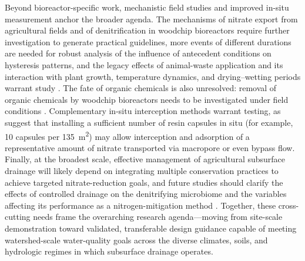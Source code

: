 \documentclass[11pt]{article}
\begin{document}
Beyond bioreactor-specific work, mechanistic field studies and improved in-situ measurement anchor the broader agenda. The mechanisms of nitrate export from agricultural fields and of denitrification in woodchip bioreactors require further investigation to generate practical guidelines, more events of different durations are needed for robust analysis of the influence of antecedent conditions on hysteresis patterns, and the legacy effects of animal-waste application and its interaction with plant growth, temperature dynamics, and drying--wetting periods warrant study \parencite{Liu2020}. The fate of organic chemicals is also unresolved: removal of organic chemicals by woodchip bioreactors needs to be investigated under field conditions \parencite{Ilhan2011}. Complementary in-situ interception methods warrant testing, as \textcite{Pampolino2000} suggest that installing a sufficient number of resin capsules in situ (for example, 10 capsules per 135~m\textsuperscript{2}) may allow interception and adsorption of a representative amount of nitrate transported via macropore or even bypass flow. Finally, at the broadest scale, effective management of agricultural subsurface drainage will likely depend on integrating multiple conservation practices to achieve targeted nitrate-reduction goals, and future studies should clarify the effects of controlled drainage on the denitrifying microbiome and the variables affecting its performance as a nitrogen-mitigation method \parencite{Wang2025b}. Together, these cross-cutting needs frame the overarching research agenda---moving from site-scale demonstration toward validated, transferable design guidance capable of meeting watershed-scale water-quality goals across the diverse climates, soils, and hydrologic regimes in which subsurface drainage operates.

\printbibliography
\end{document}
